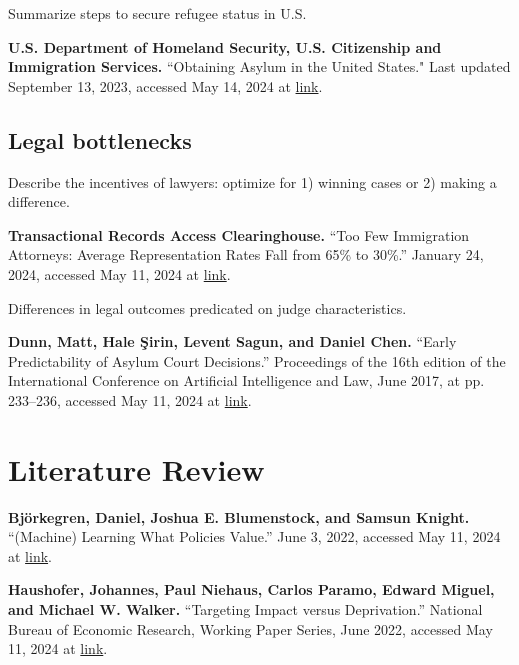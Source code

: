 \documentclass{article}
\begin{document}
\noindent Summarize steps to secure refugee status in U.S.\\

\begin{hangparas}{.25in}{1}

\textbf{U.S. Department of Homeland Security, U.S. Citizenship and Immigration Services.} ``Obtaining Asylum in the United States." Last updated September 13, 2023, accessed May 14, 2024 at \href{https://www.uscis.gov/humanitarian/refugees-and-asylum/asylum/obtaining-asylum-in-the-united-states}{link}.

\end{hangparas}

\subsection{Legal bottlenecks}

Describe the incentives of lawyers: optimize for 1) winning cases or 2) making a difference. 

\begin{hangparas}{.25in}{1}

\textbf{Transactional Records Access Clearinghouse.} “Too Few Immigration Attorneys: Average Representation Rates Fall from 65\% to 30\%.” January 24, 2024, accessed May 11, 2024 at \href{https://trac.syr.edu/reports/736/}{link}.\\

\end{hangparas}

\noindent Differences in legal outcomes predicated on judge characteristics.\\

\begin{hangparas}{.25in}{1}

\textbf{Dunn, Matt, Hale Şirin, Levent Sagun, and Daniel Chen.} “Early Predictability of Asylum Court Decisions.” Proceedings of the 16th edition of the International Conference on Artificial Intelligence and Law, June 2017, at pp. 233–236, accessed May 11, 2024 at \href{https://tinyurl.com/mpjt4sb5}{link}.

\end{hangparas}

\section{Literature Review}

\begin{hangparas}{.25in}{1}

\textbf{Björkegren, Daniel, Joshua E. Blumenstock, and Samsun Knight.} “(Machine) Learning What Policies Value.” June 3, 2022, accessed May 11, 2024 at \href{https://arxiv.org/abs/2206.00727}{link}.

\textbf{Haushofer, Johannes, Paul Niehaus, Carlos Paramo, Edward Miguel, and Michael W. Walker.} “Targeting Impact versus Deprivation.” National Bureau of Economic Research, Working Paper Series, June 2022, accessed May 11, 2024 at \href{https://www.nber.org/papers/w30138}{link}.

\end{hangparas}
\end{document}
